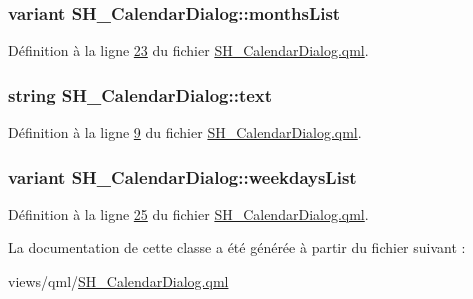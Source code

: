 \hypertarget{classSH__CalendarDialog_a86a4ef51cbfb7299a55bbddf2ae60f6a}{
\subsubsection[{months\-List}]{\setlength{\rightskip}{0pt plus 5cm}variant S\-H\-\_\-\-Calendar\-Dialog\-::months\-List}}\label{classSH__CalendarDialog_a86a4ef51cbfb7299a55bbddf2ae60f6a}


Définition à la ligne \hyperlink{SH__CalendarDialog_8qml_source_l00023}{23} du fichier \hyperlink{SH__CalendarDialog_8qml_source}{S\-H\-\_\-\-Calendar\-Dialog.\-qml}.

\hypertarget{classSH__CalendarDialog_af074ec0c262421e8bdb58357e06985fa}{
\subsubsection[{text}]{\setlength{\rightskip}{0pt plus 5cm}string S\-H\-\_\-\-Calendar\-Dialog\-::text}}\label{classSH__CalendarDialog_af074ec0c262421e8bdb58357e06985fa}


Définition à la ligne \hyperlink{SH__CalendarDialog_8qml_source_l00009}{9} du fichier \hyperlink{SH__CalendarDialog_8qml_source}{S\-H\-\_\-\-Calendar\-Dialog.\-qml}.

\hypertarget{classSH__CalendarDialog_a4ceac0c8c8f2b0d05060ddd66986b8e0}{
\subsubsection[{weekdays\-List}]{\setlength{\rightskip}{0pt plus 5cm}variant S\-H\-\_\-\-Calendar\-Dialog\-::weekdays\-List}}\label{classSH__CalendarDialog_a4ceac0c8c8f2b0d05060ddd66986b8e0}


Définition à la ligne \hyperlink{SH__CalendarDialog_8qml_source_l00025}{25} du fichier \hyperlink{SH__CalendarDialog_8qml_source}{S\-H\-\_\-\-Calendar\-Dialog.\-qml}.



La documentation de cette classe a été générée à partir du fichier suivant \-:\begin{DoxyCompactItemize}
\item 
views/qml/\hyperlink{SH__CalendarDialog_8qml}{S\-H\-\_\-\-Calendar\-Dialog.\-qml}\end{DoxyCompactItemize}
